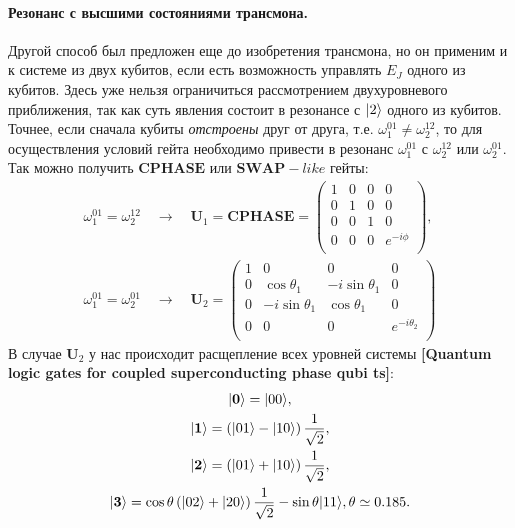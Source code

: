 \documentclass[12pt, twoside]{report}
\DeclarePairedDelimiter\ket{\lvert}{\rangle}
\numberwithin{equation}{section}
\numberwithin{figure}{section}
\begin{document}
\paragraph{Резонанс с высшими состояниями трансмона.}\label{par:CPHASE} Другой способ был предложен еще до изобретения трансмона, но он применим и к системе из двух кубитов, если есть возможность управлять $E_J$ одного из кубитов. Здесь уже нельзя ограничиться рассмотрением двухуровневого приближения, так как суть явления состоит в резонансе с $\ket{2}$ одного из кубитов. Точнее, если сначала кубиты \textit{отстроены} друг от друга, т.е. $\omega^{01}_1 \neq \omega^{12}_2$, то для осуществления условий гейта необходимо привести в резонанс $\omega^{01}_1$ с $\omega^{12}_2$ или $\omega^{01}_2$. Так можно получить $\mathbf{CPHASE}$ или $\mathbf{SWAP}-like$ гейты:
\begin{gather}
\omega^{01}_1 = \omega^{12}_2 \quad \longrightarrow \quad \mathbf{U}_1 =  \mathbf{CPHASE} = 
\begin{pmatrix}
1 & 0 & 0 & 0 \\
0 & 1 & 0 & 0 \\
0 & 0 & 1 & 0 \\
0 & 0 & 0 & e^{-i \phi} \\
\end{pmatrix}, \label{gate:CPHASE}\\
\omega^{01}_1 = \omega^{01}_2 \quad \longrightarrow \quad \mathbf{U}_2  = 
\begin{pmatrix}
1 & 0 & 0 & 0 \\
0 & \cos \theta_1 & -i \sin \theta_1 & 0 \\
0 & -i \sin \theta_1 & \cos \theta_1 & 0 \\
0 & 0 & 0 & e^{-i \theta_2} \\
\end{pmatrix} \label{gate:SWAP-like}
\end{gather}
В случае $\mathbf{U}_2$ у нас происходит расщепление всех уровней системы \textbf{[Quantum logic gates for coupled superconducting phase qubi
ts]}:
\begin{gather*}
\ket{\mathbf{0}}  = \ket{00},\\
\ket{\mathbf{1}}  = \left( \ket{01} - \ket{10} \right) \frac{1}{\sqrt{2}}, \\
\ket{\mathbf{2}}  = \left( \ket{01} + \ket{10} \right) \frac{1}{\sqrt{2}}, \\
\ket{\mathbf{3}}  = \cos \theta \left( \ket{02} + \ket{20} \right) \frac{1}{\sqrt{2}} - \sin \theta \ket{11},
\theta \simeq 0.185.
\end{gather*}
\end{document}
